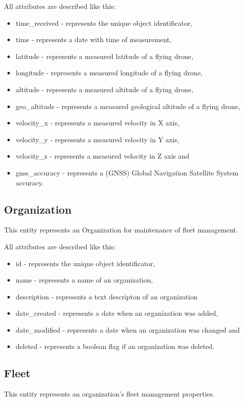 All attributes are described like this:
\begin{itemize}
    \item time\_received - represents the unique object identificator,
    \item time - represents a date with time of measurement,
    \item latitude - represents a measured latitude of a flying drone,
    \item longitude - represents a measured longitude of a flying drone,
    \item altitude - represents a measured altitude of a flying drone,
    \item geo\_altitude - represents a measured geological altitude of a flying drone,
    \item velocity\_x - represents a measured velocity in X axis,
    \item velocity\_y - represents a measured velocity in Y axis,
    \item velocity\_z - represents a measured velocity in Z axis and
    \item gnss\_accuracy - represents a (GNSS) Global Navigation Satellite System accuracy.
\end{itemize}

\subsection{Organization}\label{subsec:organization}
This entity represents an Organization for maintenance of fleet management.

All attributes are described like this:
\begin{itemize}
    \item id - represents the unique object identificator,
    \item name - represents a name of an organization,
    \item description - represents a text descripton of an organization
    \item date\_created - represents a date when an organization was added,
    \item date\_modified - represents a date when an organization was changed and
    \item deleted - represents a boolean flag if an organization was deleted.
\end{itemize}

\subsection{Fleet}\label{subsec:fleet}
This entity represents an organization's fleet management properties.

